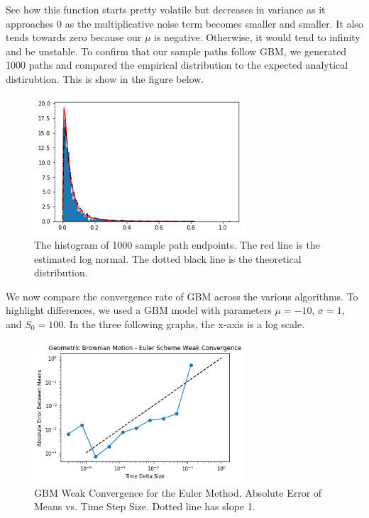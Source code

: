 \documentclass[onecolumn,notitlepage,pra,10pt,aps]{revtex4-1}
\begin{document}
  See how this function starts pretty volatile but decreases in variance as it approaches 0 as the multiplicative noise term becomes smaller and smaller. It also tends towards zero because our $\mu$ is negative. Otherwise, it would tend to infinity and be unstable. To confirm that our sample paths follow GBM, we generated 1000 paths and compared the empirical distribution to the expected analytical distirubtion. This is show in the figure below.

  \begin{figure}[H]
    \centering
      \includegraphics[width=0.7\textwidth]{lognormal_gbm.png}
    \caption{The histogram of 1000 sample path endpoints. The red line is the estimated log normal. The dotted black line is the theoretical distribution.}
  \end{figure}

  We now compare the convergence rate of GBM across the various algorithms. To highlight differences, we used a GBM model with parameters $\mu = -10$, $\sigma = 1$, and $S_0 = 100$. In the three following graphs, the x-axis is a log scale.

  \begin{figure}[H]
    \centering
      \includegraphics[width=0.7\textwidth]{gbm_euler.png}
    \caption{GBM Weak Convergence for the Euler Method. Absolute Error of Means vs. Time Step Size. Dotted line has slope 1.}
  \end{figure}
\end{document}
